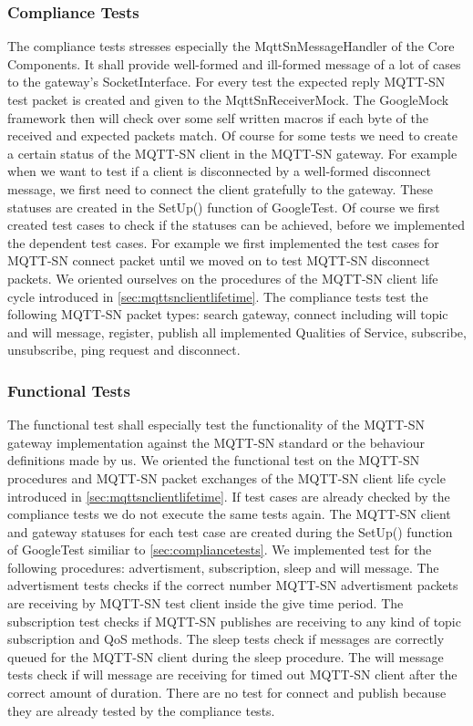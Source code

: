 \subsubsection{Compliance Tests}\label{sec:compliancetests}
The compliance tests stresses especially the MqttSnMessageHandler of the Core Components.
It shall provide well-formed and ill-formed message of a lot of cases to the gateway's SocketInterface.
For every test the expected reply MQTT-SN test packet is created and given to the MqttSnReceiverMock. The GoogleMock framework then will check over some self written macros if each byte of the received and expected packets match.
Of course for some tests we need to create a certain status of the MQTT-SN client in the MQTT-SN gateway.
For example when we want to test if a client is disconnected by a well-formed disconnect message, we first need to connect the client gratefully to the gateway.
These statuses are created in the SetUp() function of GoogleTest.
Of course we first created test cases to check if the statuses can be achieved, before we implemented the dependent test cases.
For example we first implemented the test cases for MQTT-SN connect packet until we moved on to test MQTT-SN disconnect packets.
We oriented ourselves on the procedures of the MQTT-SN client life cycle introduced in \autoref{sec:mqttsnclientlifetime}.
The compliance tests test the following MQTT-SN packet types: search gateway, connect including will topic and will message, register, publish all implemented Qualities of Service, subscribe, unsubscribe, ping request and disconnect.

\subsubsection{Functional Tests}
The functional test shall especially test the functionality of the MQTT-SN gateway implementation against the MQTT-SN standard or the behaviour definitions made by us.
We oriented the functional test on the MQTT-SN procedures and MQTT-SN packet exchanges of the MQTT-SN client life cycle introduced in \autoref{sec:mqttsnclientlifetime}.
If test cases are already checked by the compliance tests we do not execute the same tests again.
The MQTT-SN client and gateway statuses for each test case are created during the SetUp() function of GoogleTest similiar to \autoref{sec:compliancetests}.
We implemented test for the following procedures: advertisment, subscription, sleep and will message.
The advertisment tests checks if the correct number MQTT-SN advertisment packets are receiving by MQTT-SN test client inside the give time period.
The subscription test checks if MQTT-SN publishes are receiving to any kind of topic subscription and QoS methods.
The sleep tests check if messages are correctly queued for the MQTT-SN client during the sleep procedure.
The will message tests check if will message are receiving for timed out MQTT-SN client after the correct amount of duration.
There are no test for connect and publish because they are already tested by the compliance tests.


